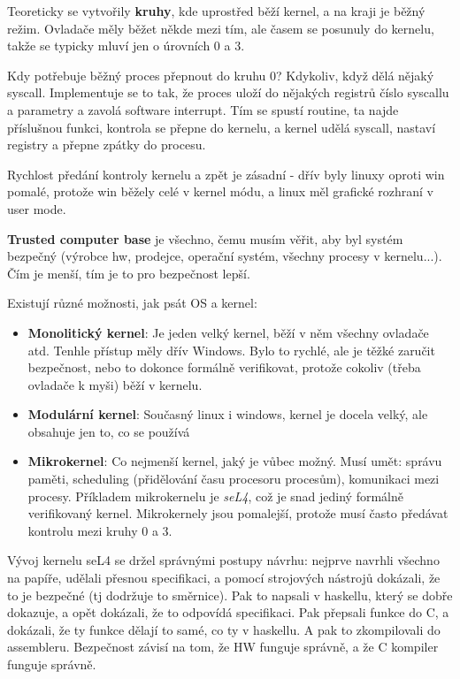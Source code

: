 Teoreticky se vytvořily \textbf{kruhy}, kde uprostřed běží kernel, a na kraji je běžný režim. Ovladače měly běžet někde mezi tím, ale časem se posunuly do kernelu, takže se typicky mluví jen o úrovních 0 a 3.

Kdy potřebuje běžný proces přepnout do kruhu 0? Kdykoliv, když dělá nějaký syscall. Implementuje se to tak, že proces uloží do nějakých registrů číslo syscallu a parametry a zavolá software interrupt. Tím se spustí routine, ta najde příslušnou funkci, kontrola se přepne do kernelu, a kernel udělá syscall, nastaví registry a přepne zpátky do procesu.

Rychlost předání kontroly kernelu a zpět je zásadní - dřív byly linuxy oproti win pomalé, protože win běžely celé v kernel módu, a linux měl grafické rozhraní v user mode.

\textbf{Trusted computer base} je všechno, čemu musím věřit, aby byl systém bezpečný (výrobce hw, prodejce, operační systém, všechny procesy v kernelu...). Čím je menší, tím je to pro bezpečnost lepší.

Existují různé možnosti, jak psát OS a kernel:
\begin{itemize}
\item \textbf{Monolitický kernel}: Je jeden velký kernel, běží v něm všechny ovladače atd. Tenhle přístup měly dřív Windows. Bylo to rychlé, ale je těžké zaručit bezpečnost, nebo to dokonce formálně verifikovat, protože cokoliv (třeba ovladače k myši) běží v kernelu.
\item \textbf{Modulární kernel}: Současný linux i windows, kernel je docela velký, ale obsahuje jen to, co se používá
\item \textbf{Mikrokernel}: Co nejmenší kernel, jaký je vůbec možný. Musí umět: správu paměti, scheduling (přidělování času procesoru procesům), komunikaci mezi procesy. Příkladem mikrokernelu je \textit{seL4}, což je snad jediný formálně verifikovaný kernel. Mikrokernely jsou pomalejší, protože musí často předávat kontrolu mezi kruhy 0 a 3. 
\end{itemize}

Vývoj kernelu seL4 se držel správnými postupy návrhu: nejprve navrhli všechno na papíře, udělali přesnou specifikaci, a pomocí strojových nástrojů dokázali, že to je bezpečné (tj dodržuje to směrnice). Pak to napsali v haskellu, který se dobře dokazuje, a opět dokázali, že to odpovídá specifikaci. Pak přepsali funkce do C, a dokázali, že ty funkce dělají to samé, co ty v haskellu. A pak to zkompilovali do assembleru. Bezpečnost závisí na tom, že HW funguje správně, a že C kompiler funguje správně.


